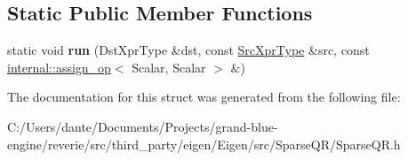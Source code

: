 \subsection*{Static Public Member Functions}
\begin{DoxyCompactItemize}
\item 
\mbox{\label{struct_eigen_1_1internal_1_1_assignment_3_01_dst_xpr_type_00_01_sparse_q_r_matrix_q_return_type_359637caee80b00c35b5e63bb0a6509c_a18b3b76ddaa1791e72d847be2d137961}} 
static void {\bfseries run} (Dst\+Xpr\+Type \&dst, const \mbox{\hyperlink{struct_eigen_1_1_sparse_q_r_matrix_q_return_type}{Src\+Xpr\+Type}} \&src, const \mbox{\hyperlink{struct_eigen_1_1internal_1_1assign__op}{internal\+::assign\+\_\+op}}$<$ Scalar, Scalar $>$ \&)
\end{DoxyCompactItemize}


The documentation for this struct was generated from the following file\+:\begin{DoxyCompactItemize}
\item 
C\+:/\+Users/dante/\+Documents/\+Projects/grand-\/blue-\/engine/reverie/src/third\+\_\+party/eigen/\+Eigen/src/\+Sparse\+Q\+R/Sparse\+Q\+R.\+h\end{DoxyCompactItemize}
